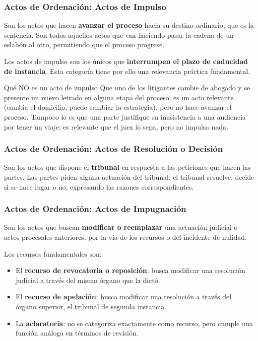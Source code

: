 \documentclass[12pt,oneside]{book}
\begin{document}
\subsubsection{Actos de Ordenación: Actos de Impulso}

Son los actos que hacen \textbf{avanzar el proceso} hacia su destino ordinario, que es la sentencia. Son todos aquellos actos que van haciendo pasar la cadena de un eslabón al otro, permitiendo que el proceso progrese.

\begin{important}
Los actos de impulso son los únicos que \textbf{interrumpen el plazo de caducidad de instancia}. Esta categoría tiene por ello una relevancia práctica fundamental.
\end{important}

\begin{example}{Qué NO es un acto de impulso}
Que uno de los litigantes cambie de abogado y se presente un nuevo letrado en alguna etapa del proceso: es un acto relevante (cambia el domicilio, puede cambiar la estrategia), pero no hace avanzar el proceso. Tampoco lo es que una parte justifique su inasistencia a una audiencia por tener un viaje: es relevante que el juez lo sepa, pero no impulsa nada.
\end{example}

\subsubsection{Actos de Ordenación: Actos de Resolución o Decisión}

Son los actos que dispone el \textbf{tribunal} en respuesta a las peticiones que hacen las partes. Las partes piden alguna actuación del tribunal; el tribunal resuelve, decide si se hace lugar o no, expresando las razones correspondientes.

\subsubsection{Actos de Ordenación: Actos de Impugnación}

Son los actos que buscan \textbf{modificar o reemplazar} una actuación judicial o actos procesales anteriores, por la vía de los recursos o del incidente de nulidad.

Los recursos fundamentales son:
\begin{itemize}
    \item El \textbf{recurso de revocatoria o reposición}: busca modificar una resolución judicial a través del mismo órgano que la dictó.
    \item El \textbf{recurso de apelación}: busca modificar una resolución a través del órgano superior, el tribunal de segunda instancia.
    \item La \textbf{aclaratoria}: no se categoriza exactamente como recurso, pero cumple una función análoga en términos de revisión.
\end{itemize}
\end{document}
